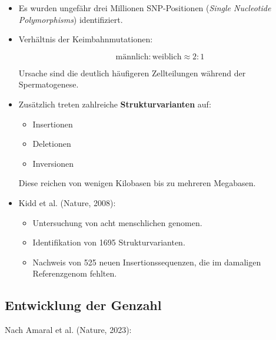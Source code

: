\begin{itemize}
    \item Es wurden ungefähr
    drei Millionen SNP-Positionen
    (\emph{Single Nucleotide Polymorphisms})
    identifiziert.

    \item Verhältnis der Keimbahnmutationen:

    \[
        \text{männlich}
        :
        \text{weiblich}
        \approx
        2:1
    \]

    Ursache sind die deutlich häufigeren
    Zellteilungen während der Spermatogenese.

    \item Zusätzlich treten zahlreiche
    \textbf{Strukturvarianten} auf:

    \begin{itemize}
        \item Insertionen
        \item Deletionen
        \item Inversionen
    \end{itemize}

    Diese reichen von wenigen Kilobasen
    bis zu mehreren Megabasen.

    \item Kidd et al.
    (Nature, 2008):

    \begin{itemize}
        \item Untersuchung von acht menschlichen \gls{genom}en.
        \item Identifikation von 1695 Strukturvarianten.
        \item Nachweis von 525 neuen Insertionssequenzen,
        die im damaligen Referenzgenom fehlten.
    \end{itemize}

\end{itemize}


\subsection*{Entwicklung der Genzahl}\label{subsec:entwicklung-der-genzahl}

Nach Amaral et al.
(Nature, 2023):

